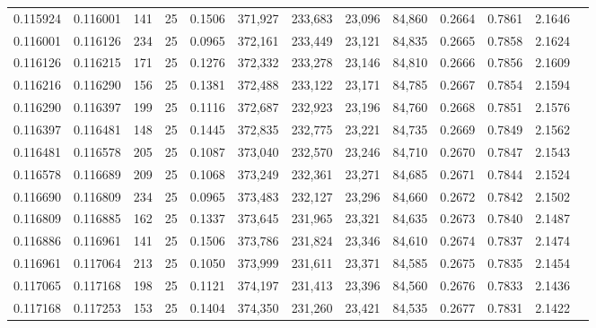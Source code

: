 \begin{tabular}{rrrrrrrrrrrrr}
0.115924 & 0.116001 &   141 &  25 &                                     0.1506 & 371,927 & 233,683 &  23,096 &  84,860 & 0.2664 & 0.7861 & 2.1646 \\
0.116001 & 0.116126 &   234 &  25 &                                     0.0965 & 372,161 & 233,449 &  23,121 &  84,835 & 0.2665 & 0.7858 & 2.1624 \\
0.116126 & 0.116215 &   171 &  25 &                                     0.1276 & 372,332 & 233,278 &  23,146 &  84,810 & 0.2666 & 0.7856 & 2.1609 \\
0.116216 & 0.116290 &   156 &  25 &                                     0.1381 & 372,488 & 233,122 &  23,171 &  84,785 & 0.2667 & 0.7854 & 2.1594 \\
0.116290 & 0.116397 &   199 &  25 &                                     0.1116 & 372,687 & 232,923 &  23,196 &  84,760 & 0.2668 & 0.7851 & 2.1576 \\
0.116397 & 0.116481 &   148 &  25 &                                     0.1445 & 372,835 & 232,775 &  23,221 &  84,735 & 0.2669 & 0.7849 & 2.1562 \\
0.116481 & 0.116578 &   205 &  25 &                                     0.1087 & 373,040 & 232,570 &  23,246 &  84,710 & 0.2670 & 0.7847 & 2.1543 \\
0.116578 & 0.116689 &   209 &  25 &                                     0.1068 & 373,249 & 232,361 &  23,271 &  84,685 & 0.2671 & 0.7844 & 2.1524 \\
0.116690 & 0.116809 &   234 &  25 &                                     0.0965 & 373,483 & 232,127 &  23,296 &  84,660 & 0.2672 & 0.7842 & 2.1502 \\
0.116809 & 0.116885 &   162 &  25 &                                     0.1337 & 373,645 & 231,965 &  23,321 &  84,635 & 0.2673 & 0.7840 & 2.1487 \\
0.116886 & 0.116961 &   141 &  25 &                                     0.1506 & 373,786 & 231,824 &  23,346 &  84,610 & 0.2674 & 0.7837 & 2.1474 \\
0.116961 & 0.117064 &   213 &  25 &                                     0.1050 & 373,999 & 231,611 &  23,371 &  84,585 & 0.2675 & 0.7835 & 2.1454 \\
0.117065 & 0.117168 &   198 &  25 &                                     0.1121 & 374,197 & 231,413 &  23,396 &  84,560 & 0.2676 & 0.7833 & 2.1436 \\
0.117168 & 0.117253 &   153 &  25 &                                     0.1404 & 374,350 & 231,260 &  23,421 &  84,535 & 0.2677 & 0.7831 & 2.1422 \\

\end{tabular}
